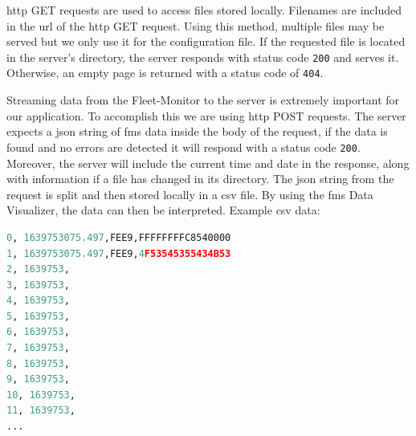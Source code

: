 \acrshort{http} GET requests are used to access files stored locally. Filenames are included in the \acrshort{url} of the \acrshort{http} GET request. Using this method, multiple files may be served but we only use it for the configuration file. If the requested file is located in the server's directory, the server responds with status code \texttt{200} and serves it. Otherwise, an empty page is returned with a status code of \texttt{404}.

Streaming data from the Fleet-Monitor to the server is extremely important for our application. To accomplish this we are using \acrshort{http} POST requests. The server expects a \acrshort{json} string of \acrshort{fms} data inside the body of the request, if the data is found and no errors are detected it will respond with a status code \texttt{200}. Moreover, the server will include the current time and date in the response, along with information if a file has changed in its directory. The \acrshort{json} string from the request is split and then stored locally in a \acrshort{csv} file. By using the \acrshort{fms} Data Visualizer, the data can then be interpreted. Example \acrshort{csv} data:

\bigskip
{}
\begin{lstlisting}[backgroundcolor=\color{gray!10},  
                   basicstyle=\ttfamily,
                   columns=fullflexible,
                   breakatwhitespace=false,      
                   breaklines=true,                
                   captionpos=b,                    
                   commentstyle=\color{mygreen}, 
                   extendedchars=true,              
                   frame=single,                   
                   keepspaces=true,             
                   keywordstyle=\color{blue},      
                   language=Python,                 
                   numbers=none,                
                   numbersep=5pt,                   
                   numberstyle=\color{blue}, 
                   rulecolor=\color{mygray},        
                   showspaces=false,
                   showstringspaces=false,
                   showtabs=false,                 
                   stepnumber=5,                  
                   stringstyle=\color{mymauve},    
                   tabsize=2,                      
                   title=\lstname,
                   frame=none,
                   xleftmargin = 1cm,
                   framexleftmargin = 1em]
0, 1639753075.497,FEE9,FFFFFFFFC8540000
1, 1639753075.497,FEE9,4F53545355434B53
2, 1639753,
3, 1639753,
4, 1639753,
5, 1639753,
6, 1639753,
7, 1639753,
8, 1639753,
9, 1639753,
10, 1639753,
11, 1639753,
...

\end{lstlisting}

